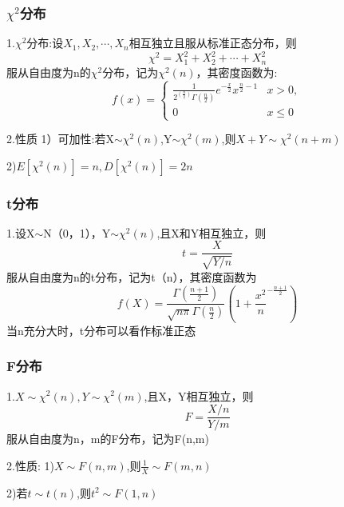 \documentclass[11pt,twoside,a4paper]{ctexart}
\begin{document}
\subsubsection{$\chi ^2$分布}
1.$\chi ^2$分布:设$X_1,X_2,\cdots ,X_n$相互独立且服从标准正态分布，则
\[\chi ^2 = X_1^2 + X_2^2 + \cdots + X_n^2\]
服从自由度为n的$\chi ^2$分布，记为$\chi^2(n)$，其密度函数为:
\[f(x) = 
\begin{cases}
    \frac{1}{2^(\frac{n}{2}) \Gamma (\frac{n}{2})}e^{-\frac{x}{2}}x^{\frac{n}{2}-1} & x>0, \\
    0 & x \leq 0
\end{cases}\]

2.性质
1）可加性:若X$\sim  \chi^2(n)$,Y$ \sim \chi^2(m)$,则$X + Y \sim \chi^2(n+m)$

2)$E[\chi ^2(n)] = n,D[\chi ^2(n)] = 2n$

\subsubsection{t分布}
1.设X$\sim $N（0，1），Y$\sim \chi^2(n)$,且X和Y相互独立，则
\[t = \frac{X}{\sqrt{Y/n}}\]
服从自由度为n的t分布，记为t（n），其密度函数为
\[f(X) = \frac{\Gamma (\frac{n+1}{2})}{\sqrt{n\pi }\Gamma (\frac{n}{2})}(1 + \frac{x^2}{n}^{-\frac{n+1}{2}})\]
当n充分大时，t分布可以看作标准正态

\subsubsection{F分布}
1.$X\sim \chi^2(n),Y\sim \chi^2(m)$,且X，Y相互独立，则
\[F = \frac{X/n}{Y/m}\]
服从自由度为n，m的F分布，记为F(n,m)

2.性质:
1)$X\sim F(n,m)$,则$\frac{1}{X}\sim F(m,n)$

2)若$t\sim t(n)$,则$t^2 \sim F(1,n)$
\end{document}
